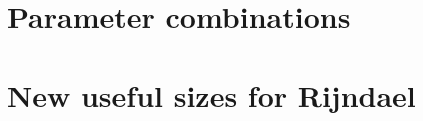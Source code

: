 \documentclass[10pt,a4paper,twoside]{llncs}
\begin{document}
\section{Parameter combinations}

\section{New useful sizes for Rijndael}
\cite{Daemen:1999:EBC:1267115.1267119}

% 



\end{document}
